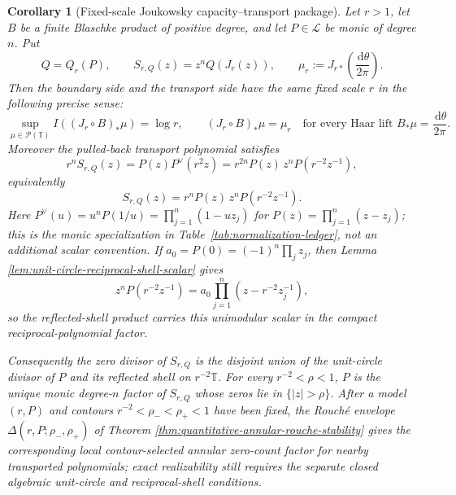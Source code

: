 \documentclass[12pt,a4paper]{article}
\theoremstyle{plain}
\newtheorem{corollary}[theorem]{Corollary}
\theoremstyle{definition}
\numberwithin{equation}{section}
\newcommand{\TT}{\mathbb{T}}
\newcommand{\dd}{\,\mathrm{d}}
\begin{document}
\begin{corollary}[Fixed-scale Joukowsky capacity--transport package]\label{cor:joukowsky-package-synthesis}
Let \(r>1\), let \(B\) be a finite Blaschke product of positive degree,
and let \(P\in\mathcal L\) be monic of degree \(n\).  Put
\[
Q=Q_r(P),\qquad
S_{r,Q}(z)=z^nQ(J_r(z)),
\qquad
\mu_r:=J_{r\ast}\!\left(\frac{\dd\theta}{2\pi}\right).
\]
Then the boundary side and the transport side have the same fixed scale
\(r\) in the following precise sense:
\[
\sup_{\mu\in\mathcal P(\TT)}I((J_r\circ B)_\ast\mu)=\log r,
\qquad
(J_r\circ B)_\ast\mu=\mu_r
\quad\text{for every Haar lift }B_\ast\mu=\frac{\dd\theta}{2\pi}.
\]
Moreover the pulled-back transport polynomial satisfies
\[
r^nS_{r,Q}(z)=P(z)P^\vee(r^2z)
=r^{2n}P(z)\,z^nP(r^{-2}z^{-1}),
\]
equivalently
\[
S_{r,Q}(z)=r^nP(z)\,z^nP(r^{-2}z^{-1}).
\]
Here \(P^\vee(u)=u^nP(1/u)=\prod_{j=1}^{n}(1-u z_j)\) for
\(P(z)=\prod_{j=1}^{n}(z-z_j)\); this is the monic specialization in
Table~\ref{tab:normalization-ledger}, not an additional scalar
convention.  If \(a_0=P(0)=(-1)^n\prod_j z_j\), then Lemma
\ref{lem:unit-circle-reciprocal-shell-scalar} gives
\[
z^nP(r^{-2}z^{-1})
=a_0\prod_{j=1}^{n}(z-r^{-2}z_j^{-1}),
\]
so the reflected-shell product carries this unimodular scalar in the
compact reciprocal-polynomial factor.

Consequently the zero divisor of \(S_{r,Q}\) is the disjoint union of the
unit-circle divisor of \(P\) and its reflected shell on \(r^{-2}\TT\).  For
every \(r^{-2}<\rho<1\), \(P\) is the unique monic degree-\(n\) factor of
\(S_{r,Q}\) whose zeros lie in \(\{|z|>\rho\}\).  After a model \((r,P)\)
and contours \(r^{-2}<\rho_-<\rho_+<1\) have been fixed, the Rouch\'e
envelope \(\Delta(r,P;\rho_-,\rho_+)\) of Theorem
\ref{thm:quantitative-annular-rouche-stability} gives the corresponding
local contour-selected annular zero-count factor for nearby transported polynomials;
exact realizability still requires the separate closed algebraic
unit-circle and reciprocal-shell conditions.
\end{corollary}
\end{document}
